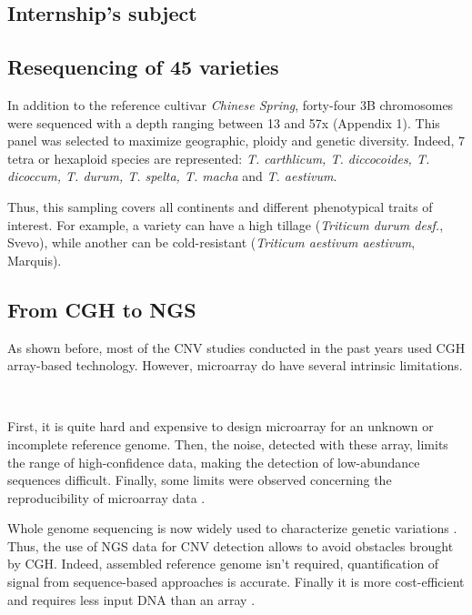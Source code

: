 \documentclass[a4paper, 12pt]{article}
\begin{document}
\begin{onehalfspace}
    \section{Internship's subject}

        \subsection{Resequencing of 45 varieties}
        
In addition to the reference cultivar \textit{Chinese Spring}, forty-four 3B chromosomes were sequenced with a depth ranging between 13 and 57x (Appendix 1). This panel was selected to maximize geographic, ploidy and genetic diversity. Indeed, 7 tetra or hexaploid species are represented: \textit{T. carthlicum, T. diccocoides, T. dicoccum, T. durum, T. spelta, T. macha} and \textit{T. aestivum}.

Thus, this sampling covers all continents and different phenotypical traits of interest. For example, a variety can have a high tillage (\textit{Triticum durum desf.}, Svevo), while another can be cold-resistant (\textit{Triticum aestivum aestivum}, Marquis).

        \subsection{From CGH to NGS}

As shown before, most of the CNV studies conducted in the past years used CGH array-based technology. However, microarray do have several intrinsic limitations. 

\newpage %
\thispagestyle{empty}
~
\addtocounter{page}{-1}
\newpage
\clearpage %

First, it is quite hard and expensive to design microarray for an unknown or incomplete reference genome. Then, the noise, detected with these array, limits the range of high-confidence data, making the detection of low-abundance sequences difficult. Finally, some limits were observed concerning the reproducibility of microarray data \citep{Ioannidis2009}.

Whole genome sequencing is now widely used to characterize genetic variations \citep{Rubin2010}. Thus, the use of NGS data for CNV detection allows to avoid obstacles brought by CGH. Indeed, assembled reference genome isn't required, quantification of signal from sequence-based approaches is accurate. Finally it is more cost-efficient and requires less input DNA than an array \citep{Hurd2009}.


\end{onehalfspace}
\end{document}
